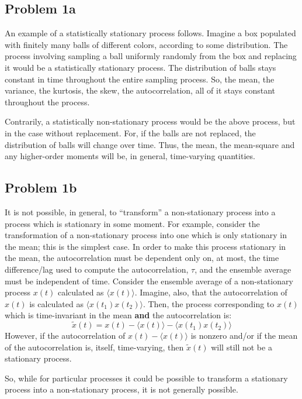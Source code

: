 \begin{homeworkProblem}
   \subsection{Problem 1a}
   An example of a statistically stationary process follows. Imagine a box
   populated with finitely many balls of different colors, according to some
   distribution. The process involving sampling a ball uniformly randomly from
   the box and replacing it would be a statistically stationary process. The
   distribution of balls stays constant in time throughout the entire sampling
   process. So, the mean, the variance, the kurtosis, the skew, the
   autocorrelation, all of it stays constant throughout the process.

   Contrarily, a statistically non-stationary process would be the above
   process, but in the case without replacement. For, if the balls are not
   replaced, the distribution of balls will change over time. Thus, the mean,
   the mean-square and any higher-order moments will be, in general,
   time-varying quantities.

   \subsection{Problem 1b} It is not possible, in general, to ``transform'' a
   non-stationary process into a process which is stationary in some moment. For
   example, consider the transformation of a non-stationary process into one
   which is only stationary in the mean; this is the simplest case. In order to
   make this process stationary in the mean, the autocorrelation must be
   dependent only on, at most, the time difference/lag used to compute the
   autocorrelation, $ \tau $, and the ensemble average must be independent of
   time. Consider the ensemble average of a non-stationary process $ x(t) $
   calculated as $ \langle x(t) \rangle  $. Imagine, also, that the
   autocorrelation of $ x(t) $ is calculated as $ \langle x(t_1) x(t_2) \rangle
   $. Then, the process corresponding to $ x(t) $ which is time-invariant in the
   mean \textbf{and} the autocorrelation is:
   \[
      \tilde{x}(t) = x(t) - \langle x(t) \rangle -
      \langle x(t_1) x(t_2) \rangle
   \]
   However, if the autocorrelation of $ x(t) -
   \langle x(t) \rangle $ is nonzero and/or if the mean of the autocorrelation
   is, itself, time-varying, then $ \tilde{x}(t) $ will still not be a stationary process.

   So, while for particular processes it could be possible to transform a
   stationary process into a non-stationary process, it is not generally
   possible.


\end{homeworkProblem}
